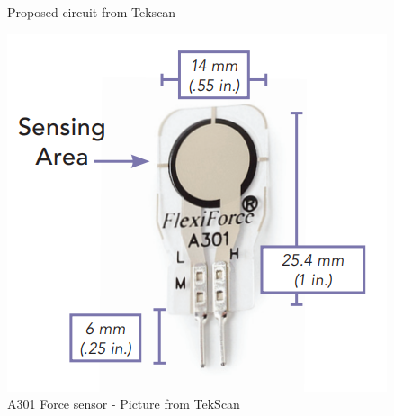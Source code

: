 \documentclass[12pt,a4paper]{article}
\begin{document}
\begin{enumerate}
\begin{figure}[hbt!]
\begin{center}
\caption{Proposed circuit from Tekscan\cite{A301}}
\end{center}
\end{figure}
\begin{figure}[hbt!]
\begin{center}
\includegraphics[scale=1]{flex.png}
\end{center}
\caption{A301 Force sensor - Picture from TekScan\cite{A301}}
\end{figure}   


\end{enumerate}
\end{document}
